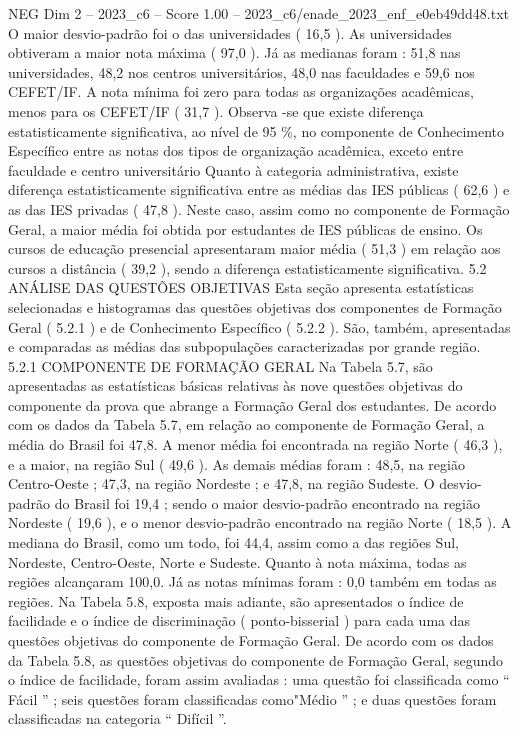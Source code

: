 \begin{textsample}{NEG Dim 2 – 2023\_c6 – Score 1.00 – 2023\_c6/enade\_2023\_enf\_e0eb49dd48.txt}
O maior desvio-padrão foi o das universidades ( 16,5 ).
As universidades obtiveram a maior nota máxima ( 97,0 ).
Já as medianas foram : 51,8 nas universidades, 48,2 nos centros universitários, 48,0 nas faculdades e 59,6 nos CEFET/IF.
A nota mínima foi zero para todas as organizações acadêmicas, menos para os CEFET/IF ( 31,7 ).
Observa -se que existe diferença estatisticamente significativa, ao nível de 95 \%, no componente de Conhecimento Específico entre as notas dos tipos de organização acadêmica, exceto entre faculdade e centro universitário Quanto à categoria administrativa, existe diferença estatisticamente significativa entre as médias das IES públicas ( 62,6 ) e as das IES privadas ( 47,8 ).
Neste caso, assim como no componente de Formação Geral, a maior média foi obtida por estudantes de IES públicas de ensino.
Os cursos de educação presencial apresentaram maior média ( 51,3 ) em relação aos cursos a distância ( 39,2 ), sendo a diferença estatisticamente significativa. 5.2 ANÁLISE DAS QUESTÕES OBJETIVAS Esta seção apresenta estatísticas selecionadas e histogramas das questões objetivas dos componentes de Formação Geral ( 5.2.1 ) e de Conhecimento Específico ( 5.2.2 ).
São, também, apresentadas e comparadas as médias das subpopulações caracterizadas por grande região. 5.2.1 COMPONENTE DE FORMAÇÃO GERAL Na Tabela 5.7, são apresentadas as estatísticas básicas relativas às nove questões objetivas do componente da prova que abrange a Formação Geral dos estudantes.
De acordo com os dados da Tabela 5.7, em relação ao componente de Formação Geral, a média do Brasil foi 47,8.
A menor média foi encontrada na região Norte ( 46,3 ), e a maior, na região Sul ( 49,6 ).
As demais médias foram : 48,5, na região Centro-Oeste ; 47,3, na região Nordeste ; e 47,8, na região Sudeste.
O desvio-padrão do Brasil foi 19,4 ; sendo o maior desvio-padrão encontrado na região Nordeste ( 19,6 ), e o menor desvio-padrão encontrado na região Norte ( 18,5 ).
A mediana do Brasil, como um todo, foi 44,4, assim como a das regiões Sul, Nordeste, Centro-Oeste, Norte e Sudeste.
Quanto à nota máxima, todas as regiões alcançaram 100,0.
Já as notas mínimas foram : 0,0 também em todas as regiões.
Na Tabela 5.8, exposta mais adiante, são apresentados o índice de facilidade e o índice de discriminação ( ponto-bisserial ) para cada uma das questões objetivas do componente de Formação Geral.
De acordo com os dados da Tabela 5.8, as questões objetivas do componente de Formação Geral, segundo o índice de facilidade, foram assim avaliadas : uma questão foi classificada como “ Fácil ” ; seis questões foram classificadas como"Médio ” ; e duas questões foram classificadas na categoria “ Difícil ”.

\end{textsample}

